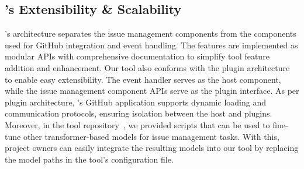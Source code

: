 \subsection{\toolname's Extensibility \& Scalability}
\toolname's architecture separates the issue management components from the components used for GitHub integration and event handling. The features are implemented as modular APIs with comprehensive documentation to simplify tool feature addition and enhancement. Our tool also conforms with the plugin architecture~\cite{pluginArchitecture} to enable easy extensibility. The event handler serves as the host component, while the issue management component APIs serve as the plugin interface. As per plugin architecture, \toolname's GitHub application supports dynamic loading and communication protocols, ensuring isolation between the host and plugins. Moreover, in the tool repository~\cite{repl_pack}, we provided scripts that can be used to fine-tune other transformer-based models for issue management tasks. With this, project owners can easily integrate the resulting models into our tool by replacing the model paths in the tool's configuration file.

